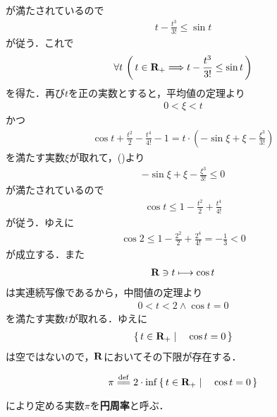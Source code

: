 	が満たされているので
	\begin{align}
		t - \frac{t^3}{3!} \leq \sin{t}
	\end{align}
	が従う．これで
	\begin{align}
		\forall t\, \left(\, t \in \mathbf{R}_{+} 
		\Longrightarrow t - \frac{t^3}{3!} \leq \sin{t}\, \right)
		\label{fom:existence_of_pi_3}
	\end{align}
	を得た．再び$t$を正の実数とすると，平均値の定理より
	\begin{align}
		0 < \xi < t
	\end{align}
	かつ
	\begin{align}
		\cos{t} + \frac{t^2}{2} - \frac{t^4}{4!} - 1 = t \cdot \left(-\sin{\xi} + \xi - \frac{\xi^3}{3!}\right)
	\end{align}
	を満たす実数$\xi$が取れて，()より
	\begin{align}
		-\sin{\xi} + \xi - \frac{\xi^3}{3!} \leq 0
	\end{align}
	が満たされているので
	\begin{align}
		\cos{t} \leq 1 - \frac{t^2}{2} + \frac{t^4}{4!}
	\end{align}
	が従う．ゆえに
	\begin{align}
		\cos{2} \leq 1 - \frac{2^2}{2} + \frac{2^4}{4!} = -\frac{1}{3} < 0
	\end{align}
	が成立する．また
	\begin{align}
		\mathbf{R} \ni t \longmapsto \cos{t}
	\end{align}
	は実連続写像であるから，中間値の定理より
	\begin{align}
		0 < t < 2 \wedge \cos{t} = 0
	\end{align}
	を満たす実数$t$が取れる．ゆえに
	\begin{align}
		\left\{\, t \in \mathbf{R}_+ \mid \quad \cos{t} = 0\, \right\}
	\end{align}
	は空ではないので，$\mathbf{R}$においてその下限が存在する．
	
	\begin{screen}
		\begin{dfn}[円周率]
			\begin{align}
				\pi \defeq 2 \cdot \inf{}{\Set{t \in \R_+}{\cos{t} = 0}}
			\end{align}
			により定める実数$\pi$を{\bf 円周率}と呼ぶ．
		\end{dfn}
	\end{screen}
	
